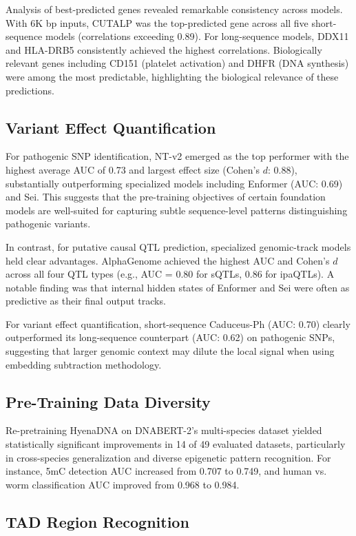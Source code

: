 \documentclass[11pt]{article}
\begin{document}
Analysis of best-predicted genes revealed remarkable consistency across models. With 6K bp inputs, CUTALP was the top-predicted gene across all five short-sequence models (correlations exceeding 0.89). For long-sequence models, DDX11 and HLA-DRB5 consistently achieved the highest correlations. Biologically relevant genes including CD151 (platelet activation) and DHFR (DNA synthesis) were among the most predictable, highlighting the biological relevance of these predictions.

\subsection{Variant Effect Quantification}

For pathogenic SNP identification, NT-v2 emerged as the top performer with the highest average AUC of 0.73 and largest effect size (Cohen's $d$: 0.88), substantially outperforming specialized models including Enformer (AUC: 0.69) and Sei. This suggests that the pre-training objectives of certain foundation models are well-suited for capturing subtle sequence-level patterns distinguishing pathogenic variants.

In contrast, for putative causal QTL prediction, specialized genomic-track models held clear advantages. AlphaGenome achieved the highest AUC and Cohen's $d$ across all four QTL types (e.g., AUC = 0.80 for sQTLs, 0.86 for ipaQTLs). A notable finding was that internal hidden states of Enformer and Sei were often as predictive as their final output tracks.

For variant effect quantification, short-sequence Caduceus-Ph (AUC: 0.70) clearly outperformed its long-sequence counterpart (AUC: 0.62) on pathogenic SNPs, suggesting that larger genomic context may dilute the local signal when using embedding subtraction methodology.

\subsection{Pre-Training Data Diversity}

Re-pretraining HyenaDNA on DNABERT-2's multi-species dataset yielded statistically significant improvements in 14 of 49 evaluated datasets, particularly in cross-species generalization and diverse epigenetic pattern recognition. For instance, 5mC detection AUC increased from 0.707 to 0.749, and human vs. worm classification AUC improved from 0.968 to 0.984.

\subsection{TAD Region Recognition}
\end{document}
